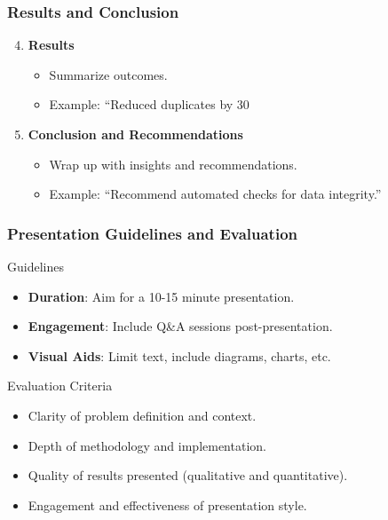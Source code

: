 \documentclass[aspectratio=169]{beamer}
\begin{document}
\begin{frame}[fragile]
    \frametitle{Results and Conclusion}
    \begin{enumerate}
        \setcounter{enumi}{3} %
        \item \textbf{Results}
            \begin{itemize}
                \item Summarize outcomes.
                \item Example: “Reduced duplicates by 30%
            \end{itemize}
        \item \textbf{Conclusion and Recommendations}
            \begin{itemize}
                \item Wrap up with insights and recommendations.
                \item Example: “Recommend automated checks for data integrity.”
            \end{itemize}
    \end{enumerate}
\end{frame}

\begin{frame}[fragile]
    \frametitle{Presentation Guidelines and Evaluation}
    \begin{block}{Guidelines}
        \begin{itemize}
            \item \textbf{Duration}: Aim for a 10-15 minute presentation.
            \item \textbf{Engagement}: Include Q&A sessions post-presentation.
            \item \textbf{Visual Aids}: Limit text, include diagrams, charts, etc.
        \end{itemize}
    \end{block}

    \begin{block}{Evaluation Criteria}
        \begin{itemize}
            \item Clarity of problem definition and context.
            \item Depth of methodology and implementation.
            \item Quality of results presented (qualitative and quantitative).
            \item Engagement and effectiveness of presentation style.
        \end{itemize}
    \end{block}
\end{frame}
\end{document}
